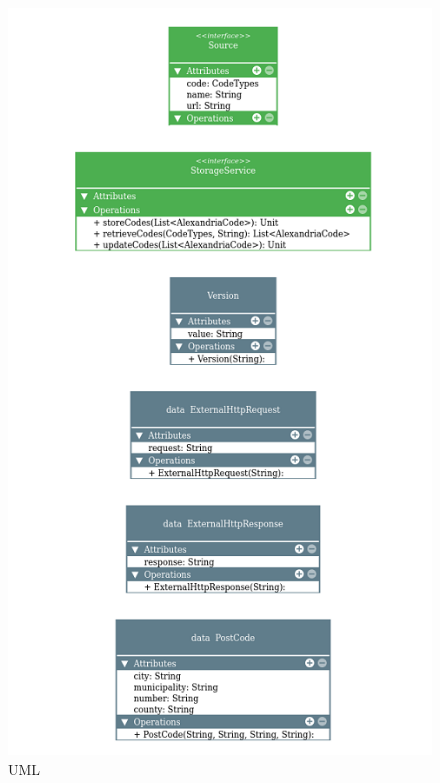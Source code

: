 \newpage
\begin{figure}[ht]
    \centering    \includegraphics{images/uml4.png}
    \caption{UML}
    \label{fig:my_label}
\end{figure}


